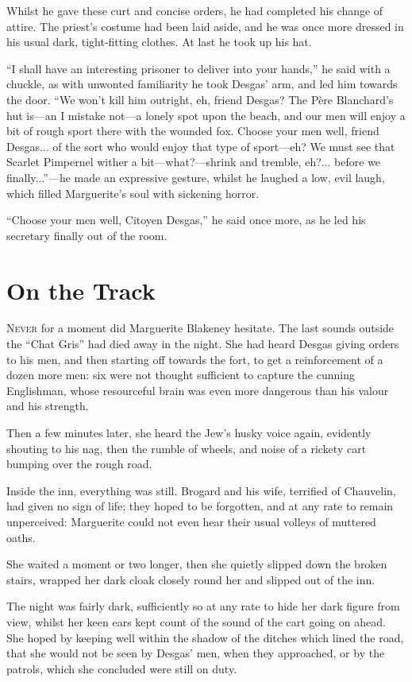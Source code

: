 \documentclass[paper=5.5in:8.5in,BCOR=7mm,twoside,DIV=calc,12pt,usegeometry,chapterprefix,endperiod,headings=big]{scrbook}
\begin{document}
Whilst he gave these curt and concise orders, he had completed his change of attire. The priest's costume had been laid aside, and he was once more dressed in his usual dark, tight-fitting clothes. At last he took up his hat.

\enquote{I shall have an interesting prisoner to deliver into your hands,} he said with a chuckle, as with unwonted familiarity he took Desgas’ arm, and led him towards the door. \enquote{We won't kill him outright, eh, friend Desgas? The Père Blanchard's hut is---an I mistake not---a lonely spot upon the beach, and our men will enjoy a bit of rough sport there with the wounded fox. Choose your men well, friend Desgas... of the sort who would enjoy that type of sport---eh? We must see that Scarlet Pimpernel wither a bit---what?---shrink and tremble, eh?... before we finally...}---he made an expressive gesture, whilst he laughed a low, evil laugh, which filled Marguerite's soul with sickening horror.

\enquote{Choose your men well, Citoyen Desgas,} he said once more, as he led his secretary finally out of the room.

\chapter{On the Track}
\lettrine[lines=4]{N}{ever} for a moment did Marguerite Blakeney hesitate. The last sounds outside the \enquote{Chat Gris} had died away in the night. She had heard Desgas giving orders to his men, and then starting off towards the fort, to get a reinforcement of a dozen more men: six were not thought sufficient to capture the cunning Englishman, whose resourceful brain was even more dangerous than his valour and his strength.

Then a few minutes later, she heard the Jew's husky voice again, evidently shouting to his nag, then the rumble of wheels, and noise of a rickety cart bumping over the rough road.

Inside the inn, everything was still. Brogard and his wife, terrified of Chauvelin, had given no sign of life; they hoped to be forgotten, and at any rate to remain unperceived: Marguerite could not even hear their usual volleys of muttered oaths.

She waited a moment or two longer, then she quietly slipped down the broken stairs, wrapped her dark cloak closely round her and slipped out of the inn.

The night was fairly dark, sufficiently so at any rate to hide her dark figure from view, whilst her keen ears kept count of the sound of the cart going on ahead. She hoped by keeping well within the shadow of the ditches which lined the road, that she would not be seen by Desgas’ men, when they approached, or by the patrols, which she concluded were still on duty.
\end{document}
